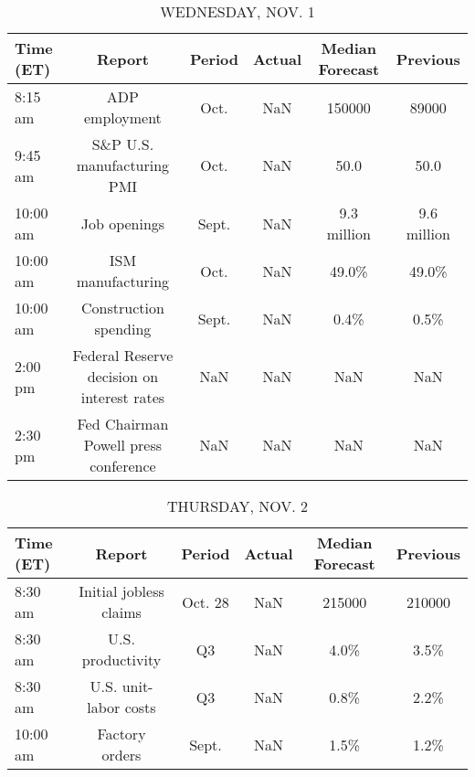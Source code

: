 \documentclass{article}%
\begin{document}
\begin{table}[htbp]%
\caption{WEDNESDAY, NOV. 1}%
\centering%
\begin{adjustbox}{width=1\textwidth}%
\begin{tabular}{lccccc}
\toprule
Time (ET) &                                     Report & Period & Actual & Median Forecast &    Previous \\
\midrule
  8:15 am &                             ADP employment &   Oct. &    NaN &          150000 &       89000 \\
  9:45 am &                 S\&P U.S. manufacturing PMI &   Oct. &    NaN &            50.0 &        50.0 \\
 10:00 am &                               Job openings &  Sept. &    NaN &     9.3 million & 9.6 million \\
 10:00 am &                          ISM manufacturing &   Oct. &    NaN &           49.0\% &       49.0\% \\
 10:00 am &                      Construction spending &  Sept. &    NaN &            0.4\% &        0.5\% \\
  2:00 pm & Federal Reserve decision on interest rates &    NaN &    NaN &             NaN &         NaN \\
  2:30 pm &       Fed Chairman Powell press conference &    NaN &    NaN &             NaN &         NaN \\
\bottomrule
\end{tabular}
%
\end{adjustbox}%
\end{table}

%


\begin{table}[htbp]%
\caption{THURSDAY, NOV. 2}%
\centering%
\begin{adjustbox}{width=1\textwidth}%
\begin{tabular}{lccccc}
\toprule
Time (ET) &                 Report &  Period & Actual & Median Forecast & Previous \\
\midrule
  8:30 am & Initial jobless claims & Oct. 28 &    NaN &          215000 &   210000 \\
  8:30 am &      U.S. productivity &      Q3 &    NaN &            4.0\% &     3.5\% \\
  8:30 am &  U.S. unit-labor costs &      Q3 &    NaN &            0.8\% &     2.2\% \\
 10:00 am &         Factory orders &   Sept. &    NaN &            1.5\% &     1.2\% \\
\bottomrule
\end{tabular}
%
\end{adjustbox}%
\end{table}
\end{document}
